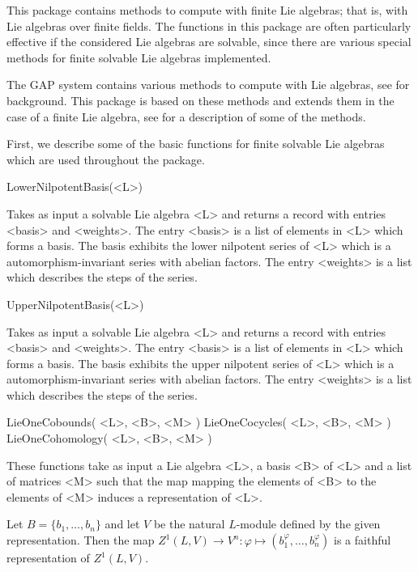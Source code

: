 

This package contains methods to compute with finite Lie algebras; that
is, with Lie algebras over finite fields. The functions in this package 
are often particularly effective if the considered Lie algebras are 
solvable, since there are various special methods for finite solvable 
Lie algebras implemented.

The GAP system contains various methods to compute with Lie algebras,
see \cite{DGr00} for background. This package is based on these methods 
and extends them in the case of a finite Lie algebra, see \cite{Eic04a}
for a description of some of the methods.


First, we describe some of the basic functions for finite solvable Lie 
algebras which are used throughout the package.

\> LowerNilpotentBasis(<L>)

Takes as input a solvable Lie algebra <L> and returns a record with
entries <basis> and <weights>. The entry <basis> is a list of elements
in <L> which forms a basis. The basis exhibits the lower nilpotent series 
of <L> which is a automorphism-invariant series with abelian factors. The 
entry <weights> is a list which describes the steps of the series.

\> UpperNilpotentBasis(<L>)

Takes as input a solvable Lie algebra <L> and returns a record with
entries <basis> and <weights>. The entry <basis> is a list of elements
in <L> which forms a basis. The basis exhibits the upper nilpotent series 
of <L> which is a automorphism-invariant series with abelian factors. The 
entry <weights> is a list which describes the steps of the series.


\> LieOneCobounds( <L>, <B>, <M> )
\> LieOneCocycles( <L>, <B>, <M> )
\> LieOneCohomology( <L>, <B>, <M> )

These functions take as input a Lie algebra <L>, a basis <B> of <L> 
and a list of matrices <M> such that the map mapping the elements of
<B> to the elements of <M> induces a representation of <L>.

Let $B = \{b_1, \ldots, b_n\}$ and let $V$ be the natural $L$-module
defined by the given representation. Then the map $Z^1(L, V) \rightarrow 
V^n : \varphi \mapsto (b_1^\varphi, \ldots, b_n^\varphi)$ is a faithful
representation of $Z^1(L, V)$.

